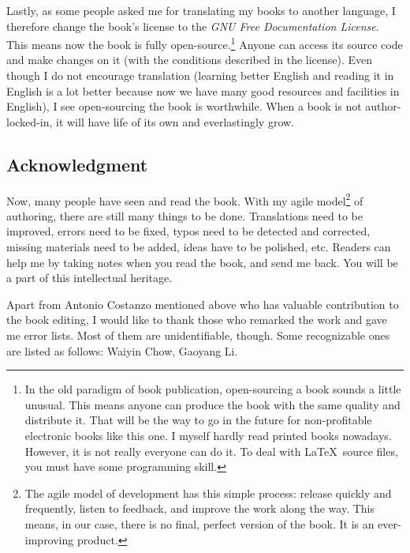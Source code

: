 Lastly, as some people asked me for translating my books to another language, I therefore change the book's license to the \emph{GNU Free Documentation License}. This means now the book is fully open-source.\footnote{In the old paradigm of book publication, open-sourcing a book sounds a little unusual. This means anyone can produce the book with the same quality and distribute it. That will be the way to go in the future for non-profitable electronic books like this one. I myself hardly read printed books nowadays. However, it is not really everyone can do it. To deal with \LaTeX\ source files, you must have some programming skill.} Anyone can access its source code and make changes on it (with the conditions described in the license). Even though I do not encourage translation (learning better English and reading it in English is a lot better because now we have many good resources and facilities in English), I see open-sourcing the book is worthwhile. When a book is not author-locked-in, it will have life of its own and everlastingly grow.

\subsection*{Acknowledgment}

Now, many people have seen and read the book. With my agile model\footnote{The agile model of development has this simple process: release quickly and frequently, listen to feedback, and improve the work along the way. This means, in our case, there is no final, perfect version of the book. It is an ever-improving product.} of authoring, there are still many things to be done. Translations need to be improved, errors need to be fixed, typos need to be detected and corrected, missing materials need to be added, ideas have to be polished, etc. Readers can help me by taking notes when you read the book, and send me back. You will be a part of this intellectual heritage.

Apart from Antonio Costanzo mentioned above who has valuable contribution to the book editing, I would like to thank those who remarked the work and gave me error lists. Most of them are unidentifiable, though. Some recognizable ones are listed as follows: Waiyin Chow, Gaoyang Li.
